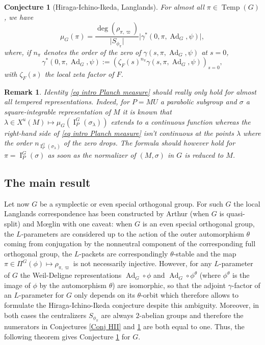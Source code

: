 \documentclass[12pt]{article}
\newtheorem{rem}{Remark}[section]
\newtheorem{conj}{Conjecture}[section]
\numberwithin{equation}{section}
\DeclareMathOperator{\Temp}{Temp}
\DeclareMathOperator{\Ad}{Ad}
\DeclareMathOperator{\rI}{\mathrm{I}}
\begin{document}
\begin{conj}[Hiraga-Ichino-Ikeda, Langlands]\label{Conj LHII}
For almost all $\pi\in \Temp(G)$, we have
\begin{equation}\label{eq intro Planch measure}
\displaystyle \mu_G(\pi)=\frac{\deg (\rho_{\pi,\varpi})}{\lvert S_{\phi_\pi}\rvert} \lvert \gamma^*(0,\pi,\Ad_G,\psi)\rvert,
\end{equation}
where, if $n_\pi$ denotes the order of the zero of $\gamma(s,\pi,\Ad_G,\psi)$ at $s=0$,
\begin{equation*}
\displaystyle \gamma^*(0,\pi,\Ad_G,\psi):=\left(\zeta_F(s)^{n_\pi} \gamma(s,\pi,\Ad_G,\psi)\right)_{s=0},
\end{equation*}
with $\zeta_F(s)$ the local zeta factor of $F$.
\end{conj}

\begin{rem}
Identity \eqref{eq intro Planch measure} should really only hold for almost all tempered representations. Indeed, for $P=MU$ a parabolic subgroup and $\sigma$ a square-integrable representation of $M$ it is known that $\lambda\in X^u(M)\mapsto \mu_G(\rI_P^G(\sigma_\lambda))$ extends to a continuous function whereas the right-hand side of \eqref{eq intro Planch measure} isn't continuous at the points $\lambda$ where the order $n_{\rI_P^G(\sigma_\lambda)}$ of the zero drops. The formula should however hold for $\pi=\rI_P^G(\sigma)$ as soon as the normalizer of $(M,\sigma)$ in $G$ is reduced to $M$.
\end{rem}

\subsection{The main result}

Let now $G$ be a symplectic or even special orthogonal group. For such $G$ the local Langlands correspondence has been constructed by Arthur \cite{artbook} (when $G$ is quasi-split) and M\oe{}glin \cite{Moegpaquetstable} with one caveat: when $G$ is an even special orthogonal group, the $L$-parameters are considered up to the action of the outer automorphism $\theta$ coming from conjugation by the nonneutral component of the corresponding full orthogonal group, the $L$-packets are correspondingly $\theta$-stable and the map $\pi\in \Pi^G(\phi)\mapsto \rho_{\pi,\varpi}$ is not necessarily injective. However, for any $L$-parameter of $G$ the Weil-Deligne representations $\Ad_G\circ \phi$ and $\Ad_G\circ \phi^\theta$ (where $\phi^\theta$ is the image of $\phi$ by the automorphism $\theta$) are isomorphic, so that the adjoint $\gamma$-factor of an $L$-parameter for $G$ only depends on its $\theta$-orbit which therefore allows to formulate the Hiraga-Ichino-Ikeda conjecture despite this ambiguity. Moreover, in both cases the centralizers $S_{\phi_\pi}$ are always $2$-abelian groups and therefore the numerators in Conjectures \ref{Conj HII} and \ref{Conj LHII} are both equal to one. Thus, the following theorem gives Conjecture \ref{Conj LHII} for $G$.
\end{document}
